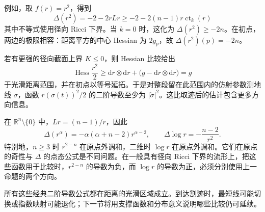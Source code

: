 例如，取 \(f(r)=r^2\)，得到
\begin{equation}\label{g3:eq:distance-square-laplacian}
	\Delta(r^2)=-2-2rLr
	\ge-2-2(n-1)r\operatorname{ct}_k(r)
\end{equation}
其中不等式使用径向 Ricci 下界。当 \(k=0\) 时，这化为 \(\Delta(r^2)\ge-2n\)。在初点，两边的极限相容：距离平方的中心 Hessian 为 \(2g_p\)，故 \(\Delta(r^2)(p)=-2n\)。

\ProseParagraphBreak

若有更强的径向截面上界 \(K\le0\)，则 Hessian 比较给出
\[
	\operatorname{Hess}\frac{r^2}{2}
	\ge\mathrm dr\otimes\mathrm dr+
	\bigl(g-\mathrm dr\otimes\mathrm dr\bigr)=g
\]
于光滑距离范围，并在初点以等号延拓。于是对整段留在此范围内的仿射参数测地线 \(\sigma\)，函数
\(r(\sigma(t))^2/2\) 的二阶导数至少为 \(|\dot\sigma|^2\)。这比取迹后的估计包含更多方向信息。

\begin{example}\label{g3:exm:euclidean-radial-laplacian}
	在 \(\mathbb R^n\setminus\{0\}\) 中，\(Lr=(n-1)/r\)，因此
	\[
		\Delta(r^\alpha)
		=-\alpha(\alpha+n-2)r^{\alpha-2},
		\qquad
		\Delta\log r=-\frac{n-2}{r^2}.
	\]
	特别地，\(n\ge3\) 时 \(r^{2-n}\) 在原点外调和，二维时 \(\log r\) 在原点外调和。它们在原点的奇性与 \(\Delta\) 的点态公式是不同问题。在一般具有径向 Ricci 下界的流形上，把这些函数用于比较时，\(r^{2-n}\) 的导数为负，而 \(\log r\) 的导数为正，必须分别使用上一命题的两个方向。
\end{example}

所有这些经典二阶导数公式都在距离的光滑区域成立。到达割迹时，最短线可能切换或指数映射可能退化；下一节将用支撑函数和分布意义说明哪些比较仍可延续。

